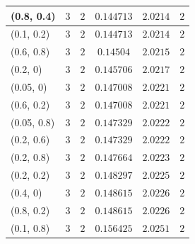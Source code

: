 \begin{center}
{\begin{longtable}{| l | c | c | c | c | c |}
(0.8, 0.4) & $3$ & $2$ & $0.144713$ & $2.0214$ & $2$ \\ \hline
(0.1, 0.2) & $3$ & $2$ & $0.144713$ & $2.0214$ & $2$ \\ \hline
(0.6, 0.8) & $3$ & $2$ & $0.14504$ & $2.0215$ & $2$ \\ \hline
(0.2, 0) & $3$ & $2$ & $0.145706$ & $2.0217$ & $2$ \\ \hline
(0.05, 0) & $3$ & $2$ & $0.147008$ & $2.0221$ & $2$ \\ \hline
(0.6, 0.2) & $3$ & $2$ & $0.147008$ & $2.0221$ & $2$ \\ \hline
(0.05, 0.8) & $3$ & $2$ & $0.147329$ & $2.0222$ & $2$ \\ \hline
(0.2, 0.6) & $3$ & $2$ & $0.147329$ & $2.0222$ & $2$ \\ \hline
(0.2, 0.8) & $3$ & $2$ & $0.147664$ & $2.0223$ & $2$ \\ \hline
(0.2, 0.2) & $3$ & $2$ & $0.148297$ & $2.0225$ & $2$ \\ \hline
(0.4, 0) & $3$ & $2$ & $0.148615$ & $2.0226$ & $2$ \\ \hline
(0.8, 0.2) & $3$ & $2$ & $0.148615$ & $2.0226$ & $2$ \\ \hline
(0.1, 0.8) & $3$ & $2$ & $0.156425$ & $2.0251$ & $2$ \\ \hline
\end{longtable}


}
\end{center}
